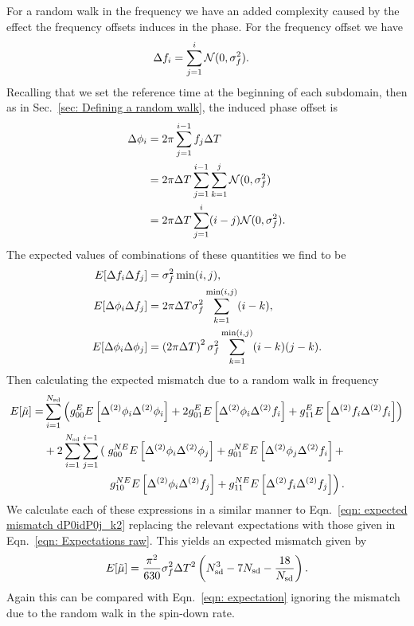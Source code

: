 For a random walk in the frequency we have an added complexity caused by the
effect the frequency offsets induces in the phase. For the frequency offset we
have
\begin{align}
\Delta f_{i} &= \sum_{j=1}^{i}\mathcal{N}(0, \sigma_{f}^{2}).
\end{align}
Recalling that we set the reference time at the beginning of each subdomain,
then as in Sec.~\ref{sec: Defining a random walk}, the induced phase offset is
\begin{align}
\Delta\phi_{i} &=2\pi \sum_{j=1}^{i-1}f_{j}\Delta T \\
 & = 2\pi\Delta T \sum_{j=1}^{i-1}\sum_{k=1}^{j}\mathcal{N}(0, \sigma_{f}^{2}) \\
& = 2\pi\Delta T \sum_{j=1}^{i}(i-j)\mathcal{N}(0, \sigma_{f}^{2}).
\end{align}
The expected values of combinations of these quantities we find to be
\begin{align}
E[\Delta f_{i}\Delta f_{j}] & = \sigma_{f}^{2} \min(i, j), \\
E[\Delta\phi_{i}\Delta f_{j}] & = 2 \pi \Delta T \sigma_{f}^{2} \sum_{k=1}^{\min(i, j)}(i-k),\\
E[\Delta\phi_{i}\Delta\phi_{j}] & =
\left(2\pi\Delta T\right)^{2}\sigma_{f}^{2} \sum_{k=1}^{\min(i, j)}(i-k)(j-k).
\label{eqn: Expectations raw}
\end{align}
Then calculating the expected mismatch due to a random walk in frequency
\begin{align}
\begin{split}
E[\mutilde] = &
\s{i=1}{\Nsd}\left(g_{00}^{E}E\left[\Delta^{(2)}\phi_{i}\Delta^{(2)}\phi_{i}\right]
+ 2 g_{01}^{E}E\left[\Delta^{(2)}\phi_{i}\Delta^{(2)}\f_{i}\right]
+  g_{11}^{E} E\left[\Delta^{(2)}\f_{i}\Delta^{(2)}\f_{i}\right] \right) \\
& + 2\s{i=1}{\Nsd}\s{j=1}{i-1}\left(\right.
g_{00}^{NE}E\left[\Delta^{(2)}\phi_{i}\Delta^{(2)}\phi_{j}\right] +
g_{01}^{NE}E\left[\Delta^{(2)}\phi_{j}\Delta^{(2)}\f_{i}\right] +  \\
&\hspace{20mm}\left. g_{10}^{NE}E\left[\Delta^{(2)}\phi_{i}\Delta^{(2)}\f_{j}\right] +
g_{11}^{NE} E\left[\Delta^{(2)}\f_{i}\Delta^{(2)}\f_{j}\right] \right).
\end{split}
\end{align}
We calculate each of these expressions in a similar manner to Eqn.~\eqref{eqn:
expected mismatch dP0idP0j_k2} replacing the relevant expectations with those
given in Eqn.~\eqref{eqn: Expectations raw}. This yields an expected
mismatch given by
\begin{equation}
E[\tilde{\mu}] = \frac{\pi^{2} }{630} \sigma_{f}^{2} \Delta T^{2}  \left(N_{\textrm{sd}}^{3} - 7N_{\textrm{sd}}- \frac{18}{N_{\textrm{sd}}} \right).
\label{eqn: Expected mismatch RW in frequency k2}
\end{equation}
Again this can be compared with Eqn.~\eqref{eqn: expectation} ignoring the
mismatch due to the random walk in the spin-down rate.


